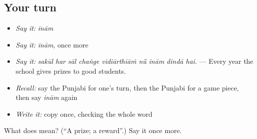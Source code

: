 \subsection*{Your turn}
\begin{itemize}
\raggedright
  \item \emph{Say it:} \emph{inām}
  \item \emph{Say it:} \emph{inām}, once more
  \item \emph{Say it:} \emph{sakūl har sāl chaṅge vidiārthīāṁ nū̃ inām dindā hai.} — Every year the school gives prizes to good students.
  \item \emph{Recall:} say the Punjabi for one's turn, then the Punjabi for a game piece, then say \emph{inām} again
  \item \emph{Write it:} copy \textbf{} once, checking the whole word
\end{itemize}

\begin{tcolorbox}[breakable,colback=teal!4,colframe=teal!35!black,title={Before you move on}]
What does  mean? (\textquotedblleft{}A prize; a reward\textquotedblright{}.) Say it once more.
\end{tcolorbox}
